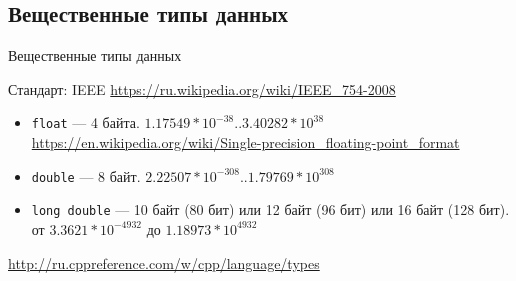 \subsection{Вещественные типы данных}

\begin{frame}[t]{Вещественные типы данных}

  Стандарт: IEEE 
  \url{https://ru.wikipedia.org/wiki/IEEE_754-2008}

  \begin{itemize}
    \item \texttt{float} --- 4 байта. $1.17549*{10}^{-38}..3.40282*{10}^{38}$ 
     \url{https://en.wikipedia.org/wiki/Single-precision_floating-point_format}
    \item \texttt{double} --- 8 байт. $2.22507*{10}^{-308}..1.79769*{10}^{308}$ 
    \item \texttt{long double} --- 10 байт (80 бит) или 12 байт (96 бит) или 16 байт (128 бит).
      от $3.3621*{10}^{-4932}$ до $1.18973*{10}^{4932}$
  \end{itemize}
  
  \url{http://ru.cppreference.com/w/cpp/language/types}
\end{frame}


\newcommand*{\info}[4][16.3]{%
  \node [ annotation, #3, scale=0.65, text width = #1em,
          inner sep = 2mm ] at (#2) {%
  \list{$\bullet$}{\topsep=0pt\itemsep=0pt\parsep=0pt
    \parskip=0pt\labelwidth=8pt\leftmargin=8pt
    \itemindent=0pt\labelsep=2pt}%
    #4
  \endlist
  };
}

